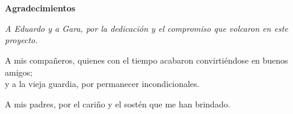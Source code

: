 
\chapter*{}
\begin{flushright}
    {\Huge\textbf{Agradecimientos}}
    \bigskip
    \bigskip

    {\itshape
        A Eduardo y a Gara, por la dedicación y el compromiso que volcaron en este proyecto.
        \medskip

        A mis compañeros, quienes con el tiempo acabaron convirtiéndose en buenos amigos; \\
        y a la vieja guardia, por permanecer incondicionales.
        \medskip

        A mis padres, por el cariño y el sostén que me han brindado.
        \medskip
    }
\end{flushright}
